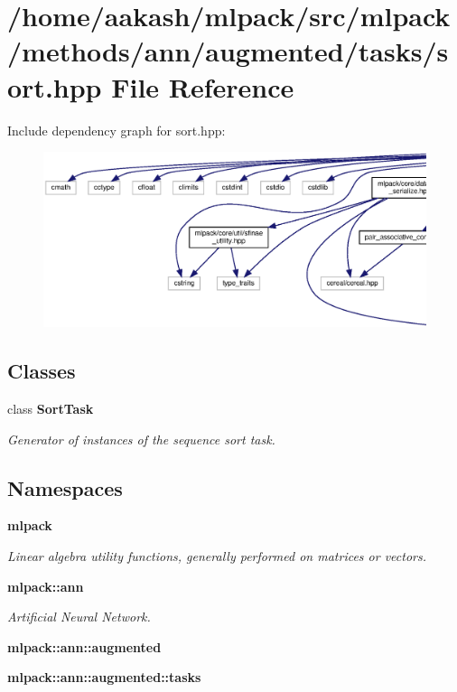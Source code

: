 \section{/home/aakash/mlpack/src/mlpack/methods/ann/augmented/tasks/sort.hpp File Reference}
\label{sort_8hpp}
Include dependency graph for sort.\+hpp\+:
\nopagebreak
\begin{figure}[H]
\begin{center}
\leavevmode
\includegraphics[width=350pt]{sort_8hpp__incl}
\end{center}
\end{figure}
\subsection*{Classes}
\begin{DoxyCompactItemize}
\item 
class \textbf{ Sort\+Task}
\begin{DoxyCompactList}\small\item\em Generator of instances of the sequence sort task. \end{DoxyCompactList}\end{DoxyCompactItemize}
\subsection*{Namespaces}
\begin{DoxyCompactItemize}
\item 
 \textbf{ mlpack}
\begin{DoxyCompactList}\small\item\em Linear algebra utility functions, generally performed on matrices or vectors. \end{DoxyCompactList}\item 
 \textbf{ mlpack\+::ann}
\begin{DoxyCompactList}\small\item\em Artificial Neural Network. \end{DoxyCompactList}\item 
 \textbf{ mlpack\+::ann\+::augmented}
\item 
 \textbf{ mlpack\+::ann\+::augmented\+::tasks}
\end{DoxyCompactItemize}


